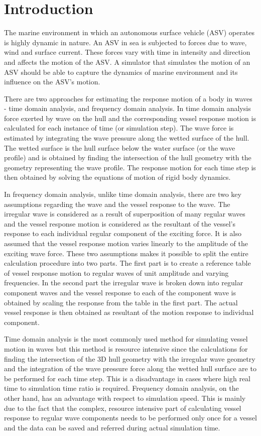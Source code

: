\section{Introduction}
The marine environment in which an autonomous surface vehicle (ASV) operates is 
highly dynamic in nature. An ASV in sea is subjected to forces due to wave, wind 
and surface current. These forces vary with time in intensity and direction and 
affects the motion of the ASV. A simulator that simulates the motion of an ASV 
should be able to capture the dynamics of marine environment and its influence 
on the ASV's motion.

There are two approaches for estimating the response motion of a body in waves - 
time domain analysis, and frequency domain analysis. In time domain analysis 
force exerted by wave on the hull and the corresponding vessel response motion 
is calculated for each instance of time (or simulation step). The wave force is
estimated by integrating the wave pressure along the wetted surface of the hull.
The wetted surface is the hull surface below the water surface (or the wave
profile) and is obtained by finding the intersection of the hull geometry with
the geometry representing the wave profile. The response motion for each time
step is then obtained by solving the equations of motion of rigid body dynamics. 

In frequency domain analysis, unlike time domain analysis, there are two key
assumptions regarding the wave and the vessel response to the wave. The 
irregular wave is considered as a result of superposition of many regular waves
and the vessel response motion is considered as the resultant of the vessel's 
response to each individual regular component of the exciting force. It is also 
assumed that the vessel response motion varies linearly to the amplitude of the 
exciting wave force. These two assumptions makes it possible to split the entire
calculation procedure into two parts. The first part is to create a reference 
table of vessel response motion to regular waves of unit amplitude and varying
frequencies. In the second part the irregular wave is broken down into regular
component waves and the vessel response to each of the component wave is 
obtained by scaling the response from the table in the first part. The actual
vessel response is then obtained as resultant of the motion response to
individual component.

Time domain analysis is the most commonly used method for simulating vessel 
motion in waves but this method is resource intensive since the calculations for
finding the intersection of the 3D hull geometry with the irregular wave 
geometry and the integration of the wave pressure force along the wetted hull 
surface are to be performed for each time step. This is a disadvantage in cases 
where high real time to simulation time ratio is required. Frequency domain 
analysis, on the other hand, has an advantage with respect to simulation speed. 
This is mainly due to the fact that the complex, resource intensive part of 
calculating vessel response to regular wave components needs to be performed 
only once for a vessel and the data can be saved and referred during actual 
simulation time.   

